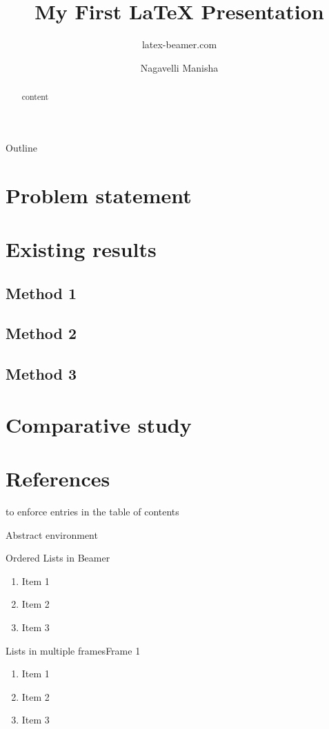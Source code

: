 \documentclass{beamer}
\title{My First \LaTeX{} Presentation}
\author{latex-beamer.com}
\institute{Online Beamer Tutorials}
\author{Nagavelli Manisha}
\begin{document}
\begin{frame}
    \titlepage
\end{frame}

\begin{frame}{Outline}
  \tableofcontents
 \end{frame}

\section{Problem statement}
 \section{Existing results}
   \subsection{Method 1}
   \subsection{Method 2}
   \subsection{Method 3}
\section{Comparative study}
 \section*{References}

 \begin{frame}
 to enforce entries in the table of contents
\end{frame}

 Abstract environment
\begin{abstract}
  content
\end{abstract}

 \begin{frame}{Ordered Lists in Beamer}
\begin{enumerate}
    \item Item 1
    \item Item 2
    \item Item 3
\end{enumerate}
 \end{frame}

\begin{frame}{Lists in multiple frames}{Frame 1}
\begin{enumerate}
    \item Item 1
    \item Item 2
   \item Item 3
   \setcounter{currentenumi}{\theenumi}
\end{enumerate}
 \end{frame}
\end{document}
